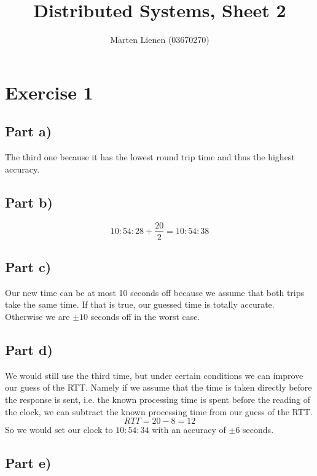 \documentclass[10pt,a4paper]{article}
\title{Distributed Systems, Sheet 2}
\author{Marten Lienen (03670270)}
\begin{document}
\maketitle

\section*{Exercise 1}

\subsection*{Part a)}

The third one because it has the lowest round trip time and thus the highest
accuracy.

\subsection*{Part b)}

\begin{equation*}
  10:54:28 + \frac{20}{2} = 10:54:38
\end{equation*}

\subsection*{Part c)}

Our new time can be at most 10 seconds off because we assume that both trips
take the same time. If that is true, our guessed time is totally
accurate. Otherwise we are $\pm 10$ seconds off in the worst case.

\subsection*{Part d)}

We would still use the third time, but under certain conditions we can improve
our guess of the RTT. Namely if we assume that the time is taken directly before
the response is sent, i.e. the known processing time is spent before the reading
of the clock, we can subtract the known processing time from our guess of the
RTT.
\begin{equation*}
  RTT = 20 - 8 = 12
\end{equation*}
So we would set our clock to $10:54:34$ with an accuracy of $\pm 6$ seconds.

\subsection*{Part e)}
\end{document}
